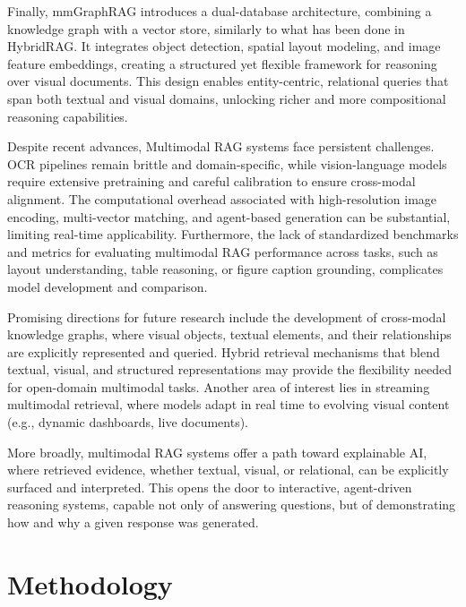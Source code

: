 \documentclass[12pt,twoside]{report}
\begin{document}
Finally, mmGraphRAG introduces a dual-database architecture, combining a knowledge graph with a vector store, similarly to what has been done in HybridRAG\cite{HybridRAG}. It integrates object detection, spatial layout modeling, and image feature embeddings, creating a structured yet flexible framework for reasoning over visual documents. This design enables entity-centric, relational queries that span both textual and visual domains, unlocking richer and more compositional reasoning capabilities.

Despite recent advances, Multimodal RAG systems face persistent challenges. OCR pipelines remain brittle and domain-specific, while vision-language models require extensive pretraining and careful calibration to ensure cross-modal alignment. The computational overhead associated with high-resolution image encoding, multi-vector matching, and agent-based generation can be substantial, limiting real-time applicability. Furthermore, the lack of standardized benchmarks and metrics for evaluating multimodal RAG performance across tasks, such as layout understanding, table reasoning, or figure caption grounding, complicates model development and comparison.

Promising directions for future research include the development of cross-modal knowledge graphs, where visual objects, textual elements, and their relationships are explicitly represented and queried. Hybrid retrieval mechanisms that blend textual, visual, and structured representations may provide the flexibility needed for open-domain multimodal tasks. Another area of interest lies in streaming multimodal retrieval, where models adapt in real time to evolving visual content (e.g., dynamic dashboards, live documents).

More broadly, multimodal RAG systems offer a path toward explainable AI\cite{ExplainAI}, where retrieved evidence, whether textual, visual, or relational, can be explicitly surfaced and interpreted. This opens the door to interactive, agent-driven reasoning systems, capable not only of answering questions, but of demonstrating how and why a given response was generated.

\chapter{Methodology}
\end{document}
